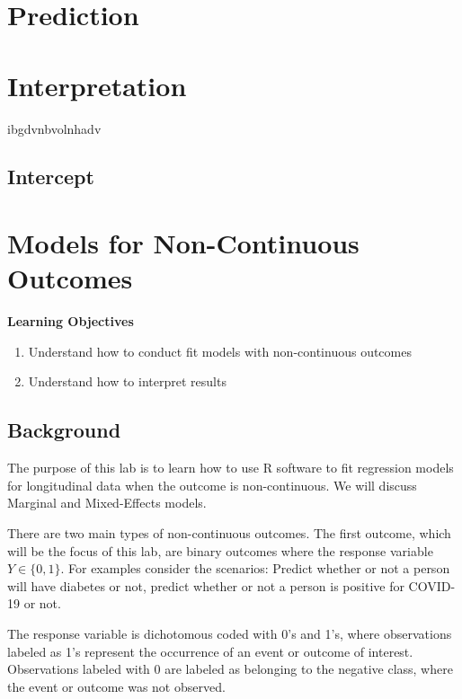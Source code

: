 \documentclass[
  letterpaper,
  DIV=11,
  numbers=noendperiod]{scrreprt}
\providecommand{\tightlist}{%
  \setlength{\itemsep}{0pt}\setlength{\parskip}{0pt}}\usepackage{longtable,booktabs,array}
\begin{document}
\hypertarget{sec-longi-prediction}{%
\chapter{Prediction}\label{sec-longi-prediction}}

\hypertarget{sec-longi-interpretation}{%
\chapter{Interpretation}\label{sec-longi-interpretation}}

ibgdvnbvolnhadv

\hypertarget{intercept}{%
\section{Intercept}\label{intercept}}

\hypertarget{sec-longi-noncontinuous}{%
\chapter{Models for Non-Continuous
Outcomes}\label{sec-longi-noncontinuous}}

\textbf{Learning Objectives}

\begin{enumerate}
\def\labelenumi{\arabic{enumi}.}
\tightlist
\item
  Understand how to conduct fit models with non-continuous outcomes
\item
  Understand how to interpret results
\end{enumerate}

\hypertarget{background}{%
\section{Background}\label{background}}

The purpose of this lab is to learn how to use R software to fit
regression models for longitudinal data when the outcome is
non-continuous. We will discuss Marginal and Mixed-Effects models.

There are two main types of non-continuous outcomes. The first outcome,
which will be the focus of this lab, are binary outcomes where the
response variable \(Y \in \{0,1\}\). For examples consider the
scenarios: Predict whether or not a person will have diabetes or not,
predict whether or not a person is positive for COVID-19 or not.

The response variable is dichotomous coded with 0's and 1's, where
observations labeled as 1's represent the occurrence of an event or
outcome of interest. Observations labeled with 0 are labeled as
belonging to the negative class, where the event or outcome was not
observed.
\end{document}
